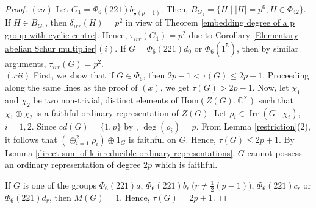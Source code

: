 \documentclass[a4paper,11pt]{amsart}
\numberwithin{equation}{section}
\numberwithin{equation}{subsection}
\newcommand{\C}{\mathbb{C}}
\newcommand{\Hom}{\mathrm{Hom}}
\begin{document}
\begin{proof}
$(xi)$ Let $G_1 = \Phi_{6}(221)b_{\tfrac{1}{2}(p-1)}$. Then, $B_{G_1}= \{H \mid |H|= p^6, H \in \Phi_{42}\}$. If $H \in B_{G_1}$, then $\delta_{irr}(H)=p^2$ in view of Theorem \ref{embedding degree of a p group with cyclic centre}. Hence, $\tau_{irr}(G_1)= p^2$ due to Corollary \ref{Elementary abelian Schur multiplier}$(i)$.
If $G = \Phi_{6}(221)d_0$ or $\Phi_{6}(1^5)$, then by similar arguments, $\tau_{irr}(G)= p^2$. \\




$(xii)$ First, we show that if  $G\in \Phi_6$, then  $2p-1 < \tau(G) \leq 2p+1$. Proceeding along the same lines as the proof of $(x)$, we get $\tau(G) > 2p-1$. Now, let $\chi_1$ and $\chi_2$ be two non-trivial, distinct elements of $\Hom(Z(G), \C^\times)$ such that $\chi_1 \oplus \chi_2$ is a faithful ordinary representation of $Z(G)$. Let $\rho_i \in \operatorname{Irr}({G} \mid \chi_i)$, $i=1,2$. Since $cd(G)=\{1,p\}$ by  \cite[Table 4.1]{james}, $\operatorname{deg}(\rho_i)=p$. 
From Lemma \ref{restriction}(2), it follows that $(\oplus_{i=1}^2 \rho_i)\oplus 1_G$ is faithful on $G$. Hence, $\tau(G) \leq 2p+1$. 
By Lemma \ref{direct sum of k irreducible ordinary representations}, $G$ cannot possess an ordinary representation of degree $2p$ which is faithful. 

If $G$ is one of the groups $\Phi_{6}(221)a$, $\Phi_{6}(221)b_r \ \big(r \neq \tfrac{1}{2}(p-1)\big)$, $\Phi_{6}(221)c_r$ or $\Phi_{6}(221)d_r$, then $M(G)= 1$. Hence, $\tau(G) = 2p+1$.


\end{proof}
\end{document}
